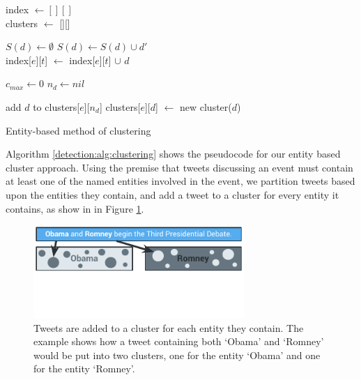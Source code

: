 \begin{algorithm}[t]
	\DontPrintSemicolon
	index $\gets [][]$ \\
	clusters $\gets$ [][] \\

	 {

		 {

			$S(d) \gets \emptyset$ 
			 {
				 {
					$S(d) \gets S(d) \cup d'$ \\
				}
				index[$e$][$t$] $\gets$ index[$e$][$t$] $\cup$ $d$ \\
			}

			$c_{max} \gets 0$ 
			$n_{d} \gets nil$ 

			 {
				add $d$ to clusters[$e$][$n_d$]
			}{
				clusters[$e$][$d$] $\gets$ new cluster($d$)
			}

		}
	}

\caption{Entity-based method of clustering}
\label{detection:alg:clustering}
\end{algorithm}

Algorithm \ref{detection:alg:clustering} shows the pseudocode for our entity based cluster approach.
Using the premise that tweets discussing an event must contain at least one of the named entities involved in the event, we partition tweets based upon the entities they contain, and add a tweet to a cluster for every entity it contains, as show in in Figure \ref{detection:graphic:clustering}.

\begin{figure}[h!]
	\centering
	\includegraphics[width=8cm,trim=0cm 1.5cm 0cm 0cm]{Chapters/EntityDetection/images/clustering.pdf}
	\caption[Entity-based clustering]{Tweets are added to a cluster for each entity they contain. The example shows how a tweet containing both `Obama' and `Romney' would be put into two clusters, one for the entity `Obama' and one for the entity `Romney'.}
	\label{detection:graphic:clustering}
\end{figure}


